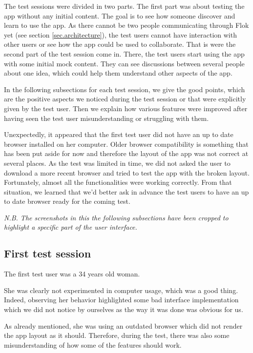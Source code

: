 \documentclass[a4paper,12pt,twoside]{article}
\begin{document}
The test sessions were divided in two parts.
The first part was about testing the app without any initial content.
The goal is to see how someone discover and learn to use the app.
As there cannot be two people communicating through Flok yet (see section \ref{sec.architecture}), the test users cannot have interaction with other users or see how the app could be used to collaborate.
That is were the second part of the test session come in.
There, the test users start using the app with some initial mock content.
They can see discussions between several people about one idea, which could help them understand other aspects of the app.

In the following subsections for each test session, we give the good points, which are the positive aspects we noticed during the test session or that were explicitly given by the test user.
Then we explain how various features were improved after having seen the test user misunderstanding or struggling with them.

Unexpectedly, it appeared that the first test user did not have an up to date browser installed on her computer.
Older browser compatibility is something that has been put aside for now and therefore the layout of the app was not correct at several places.
As the test was limited in time, we did not asked the user to download a more recent browser and tried to test the app with the broken layout.
Fortunately, almost all the functionalities were working correctly.
From that situation, we learned that we'd better ask in advance the test users to have an up to date browser ready for the coming test.

\emph{N.B. The screenshots in this the following subsections have been cropped to highlight a specific part of the user interface.}

\subsection{First test session}
The first test user was a 34 years old woman.

She was clearly not experimented in computer usage, which was a good thing.
Indeed, observing her behavior highlighted some bad interface implementation which we did not notice by ourselves as the way it was done was obvious for us.

As already mentioned, she was using an outdated browser which did not render the app layout as it should.
Therefore, during the test, there was also some misunderstanding of how some of the features should work.
\end{document}
